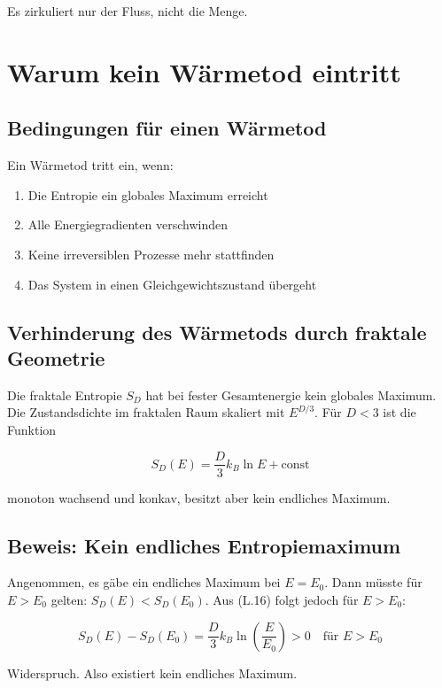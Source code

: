 Es zirkuliert nur der Fluss, nicht die Menge.

\section{Warum kein Wärmetod eintritt}
\label{app:fraktale_entropie_waermetod}

\subsection{Bedingungen für einen Wärmetod}
\label{sub:fraktale_entropie_waermetod_bedingungen}

Ein Wärmetod tritt ein, wenn:
\begin{enumerate}
    \item Die Entropie ein globales Maximum erreicht
    \item Alle Energiegradienten verschwinden
    \item Keine irreversiblen Prozesse mehr stattfinden
    \item Das System in einen Gleichgewichtszustand übergeht
\end{enumerate}

\subsection{Verhinderung des Wärmetods durch fraktale Geometrie}
\label{sub:fraktale_entropie_verhinderung}

Die fraktale Entropie $S_D$ hat bei fester Gesamtenergie kein globales Maximum. 
Die Zustandsdichte im fraktalen Raum skaliert mit $E^{D/3}$. Für $D < 3$ ist die 
Funktion

\[
S_D(E) = \frac{D}{3}k_B \ln E + \text{const} \tag{L.16}
\]

monoton wachsend und konkav, besitzt aber kein endliches Maximum.

\subsection{Beweis: Kein endliches Entropiemaximum}
\label{sub:fraktale_entropie_beweis}

Angenommen, es gäbe ein endliches Maximum bei $E = E_0$. Dann müsste für $E > E_0$ 
gelten: $S_D(E) < S_D(E_0)$. Aus (L.16) folgt jedoch für $E > E_0$:

\[
S_D(E) - S_D(E_0) = \frac{D}{3}k_B \ln \left( \frac{E}{E_0} \right) > 0 \quad \text{für } E > E_0 \tag{L.17}
\]

Widerspruch. Also existiert kein endliches Maximum.

